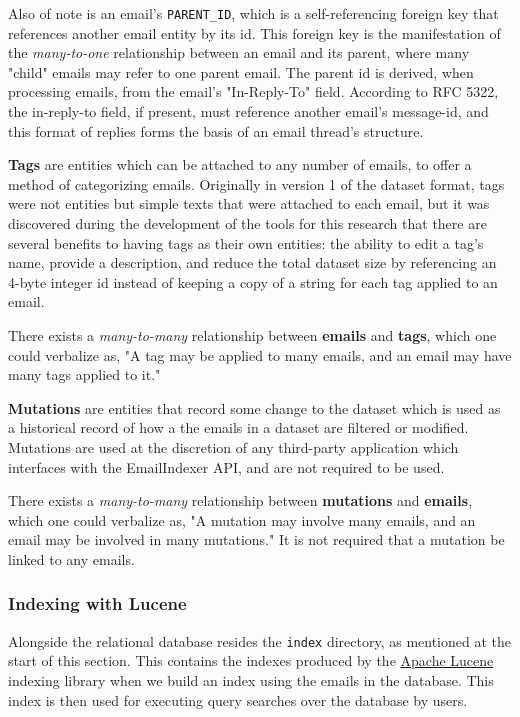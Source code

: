 \documentclass[a4paper, 12pt]{article}
\begin{document}
			Also of note is an email's \texttt{PARENT\_ID}, which is a self-referencing foreign key that references another email entity by its id. This foreign key is the manifestation of the \textit{many-to-one} relationship between an email and its parent, where many "child" emails may refer to one parent email. The parent id is derived, when processing emails, from the email's "In-Reply-To" field. According to RFC 5322, the in-reply-to field, if present, must reference another email's message-id, and this format of replies forms the basis of an email thread's structure\cite{rfc5322}.
			
			\textbf{Tags} are entities which can be attached to any number of emails, to offer a method of categorizing emails. Originally in version 1 of the dataset format, tags were not entities but simple texts that were attached to each email, but it was discovered during the development of the tools for this research that there are several benefits to having tags as their own entities: the ability to edit a tag's name, provide a description, and reduce the total dataset size by referencing an 4-byte integer id instead of keeping a copy of a string for each tag applied to an email.
			
			There exists a \textit{many-to-many} relationship between \textbf{emails} and \textbf{tags}, which one could verbalize as, "A tag may be applied to many emails, and an email may have many tags applied to it."
			
			\textbf{Mutations} are entities that record some change to the dataset which is used as a historical record of how a the emails in a dataset are filtered or modified. Mutations are used at the discretion of any third-party application which interfaces with the EmailIndexer API, and are not required to be used.
			
			There exists a \textit{many-to-many} relationship between \textbf{mutations} and \textbf{emails}, which one could verbalize as, "A mutation may involve many emails, and an email may be involved in many mutations." It is not required that a mutation be linked to any emails.
			
		\subsubsection{Indexing with Lucene}
			Alongside the relational database resides the \texttt{index} directory, as mentioned at the start of this section. This contains the indexes produced by the \href{https://lucene.apache.org/}{Apache Lucene} indexing library when we build an index using the emails in the database. This index is then used for executing query searches over the database by users.
			
\end{document}

